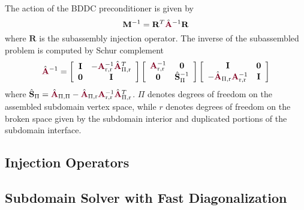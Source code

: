 \begin{definition}
The action of the BDDC preconditioner is given by
\begin{equation}
\mathbf{M}^{-1} = \mathbf{R}^T \hat{\color{burgundy}\mathbf{A}}^{-1} \mathbf{R}
\end{equation}
where $\mathbf{R}$ is the subassembly injection operator.
The inverse of the subassembled problem is computed by Schur complement
\begin{equation}
\hat{\color{burgundy}\mathbf{A}}^{-1} =
\left[ \begin{array}{c c}
\mathbf{I}  &  -{\color{burgundy}\mathbf{A}}_{\text{r}, \text{r}}^{-1} \hat{\color{burgundy}\mathbf{A}}_{\Pi, \text{r}}^T  \\
\mathbf{0}  &  \mathbf{I}                                                                                                  \\
\end{array} \right]
\left[ \begin{array}{c c}
{\color{burgundy}\mathbf{A}}_{\text{r}, \text{r}}^{-1}  &  \mathbf{0}                   \\
\mathbf{0}                                              &  \hat{\mathbf{S}}_{\Pi}^{-1}  \\
\end{array} \right]
\left[ \begin{array}{c c}
\mathbf{I}                                                                                                &  \mathbf{0}  \\
-\hat{\color{burgundy}\mathbf{A}}_{\Pi, \text{r}} {\color{burgundy}\mathbf{A}}_{\text{r}, \text{r}}^{-1}  &  \mathbf{I}  \\
\end{array} \right]
\end{equation}
where $\hat{\mathbf{S}}_{\Pi} = \hat{\color{burgundy}\mathbf{A}}_{\Pi, \Pi} - \hat{\color{burgundy}\mathbf{A}}_{\Pi, \text{r}} {\color{burgundy}\mathbf{A}}_{\text{r}, \text{r}}^{-1} \hat{\color{burgundy}\mathbf{A}}_{\Pi, \text{r}}^T$.
$\Pi$ denotes degrees of freedom on the assembled subdomain vertex space, while $r$ denotes degrees of freedom on the broken space given by the subdomain interior and duplicated portions of the subdomain interface.
\label{def:bddcpreconditioner}
\end{definition}

\subsection{Injection Operators}


\subsection{Subdomain Solver with Fast Diagonalization}

